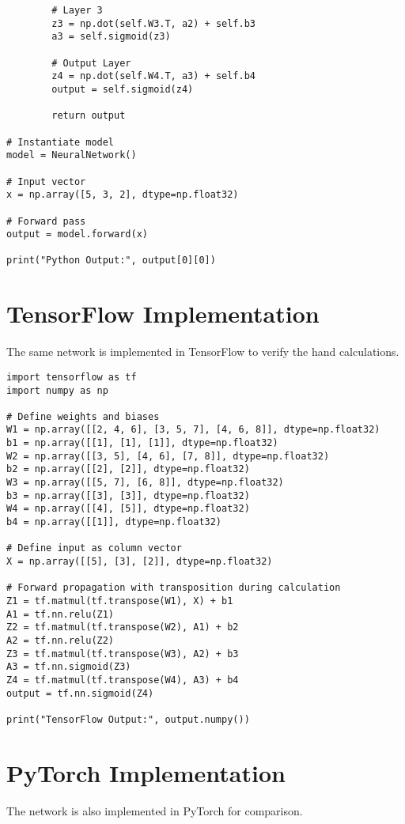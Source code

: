\documentclass[a4paper,12pt]{article}
\begin{document}
\begin{lstlisting}
        # Layer 3
        z3 = np.dot(self.W3.T, a2) + self.b3
        a3 = self.sigmoid(z3)

        # Output Layer
        z4 = np.dot(self.W4.T, a3) + self.b4
        output = self.sigmoid(z4)

        return output

# Instantiate model
model = NeuralNetwork()

# Input vector
x = np.array([5, 3, 2], dtype=np.float32)

# Forward pass
output = model.forward(x)

print("Python Output:", output[0][0])
\end{lstlisting}

\newpage

\section{TensorFlow Implementation}
The same network is implemented in TensorFlow to verify the hand calculations.

\lstset{language=Python}
\begin{lstlisting}
import tensorflow as tf
import numpy as np

# Define weights and biases
W1 = np.array([[2, 4, 6], [3, 5, 7], [4, 6, 8]], dtype=np.float32)
b1 = np.array([[1], [1], [1]], dtype=np.float32)
W2 = np.array([[3, 5], [4, 6], [7, 8]], dtype=np.float32)
b2 = np.array([[2], [2]], dtype=np.float32)
W3 = np.array([[5, 7], [6, 8]], dtype=np.float32)
b3 = np.array([[3], [3]], dtype=np.float32)
W4 = np.array([[4], [5]], dtype=np.float32)
b4 = np.array([[1]], dtype=np.float32)

# Define input as column vector
X = np.array([[5], [3], [2]], dtype=np.float32)

# Forward propagation with transposition during calculation
Z1 = tf.matmul(tf.transpose(W1), X) + b1
A1 = tf.nn.relu(Z1)
Z2 = tf.matmul(tf.transpose(W2), A1) + b2
A2 = tf.nn.relu(Z2)
Z3 = tf.matmul(tf.transpose(W3), A2) + b3
A3 = tf.nn.sigmoid(Z3)
Z4 = tf.matmul(tf.transpose(W4), A3) + b4
output = tf.nn.sigmoid(Z4)

print("TensorFlow Output:", output.numpy())
\end{lstlisting}

\newpage

\section{PyTorch Implementation}
The network is also implemented in PyTorch for comparison.
\end{document}
